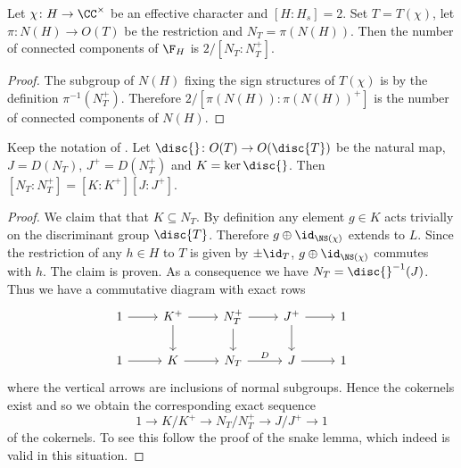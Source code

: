 \begin{proposition}\label{quadruplewithtriple}
 Let $\chi \colon H \to \CC^\times$ be an effective character and $[H:H_s]=2$.
  Set $T = T(\chi)$, let $\pi \colon N(H) \to O(T)$ be the restriction and $N_T= \pi(N(H))$.
 Then the number of connected components of $\F_H$ is $2/[N_T:N_T^+]$.
\end{proposition}
\begin{proof}
  The subgroup of $N(H)$ fixing the sign structures of $T(\chi)$ is by the definition $\pi^{-1}(N_T^+)$.
Therefore $2/[\pi(N(H)):\pi(N(H))^+]$ is the number of connected components of $N(H)$.
\end{proof}

\begin{lemma}
 Keep the notation of .
 Let $\disc{} \colon O(T) \to O(\disc{T})$ be the natural map, $J =D(N_T)$, $J^+=D(N_T^+)$ and
 $K = \ker \disc{}$.
 Then $[N_T:N_T^+] = [K:K^+][J:J^+]$.
\end{lemma}
\begin{proof}
We claim that that $K \subseteq N_T$. By definition any element $g\in K$ acts trivially on the discriminant group $\disc{T}$. Therefore $g\oplus \id_{\NS(\chi)}$ extends to $L$. Since the restriction of any $h\in H$ to $T$ is given by $\pm \id_{T}$, $g \oplus \id_{\NS(\chi)}$ commutes with $h$. The claim is proven.
As a consequence we have $N_T = \disc{}^{-1}(J)$.
Thus we have a commutative diagram with exact rows
\[
\begin{tikzcd}
  1\arrow[r]& K^+ \arrow[r]\arrow[d] &N_T^+ \arrow[r]\arrow[d]& J^+\arrow[r]\arrow[d] & 1\\
1\arrow[r]& K\arrow[r] &N_T\arrow[r]{}{D} & J \arrow[r] &1
\end{tikzcd}\]
where the vertical arrows are inclusions of normal subgroups.
Hence the cokernels exist and so
we obtain the corresponding exact sequence
\[1 \to K/K^+ \to N_T/N_T^+ \to J/J^+ \to 1\]
of the cokernels. To see this follow the proof of the snake lemma, which indeed is valid in this situation.
%
\end{proof}



